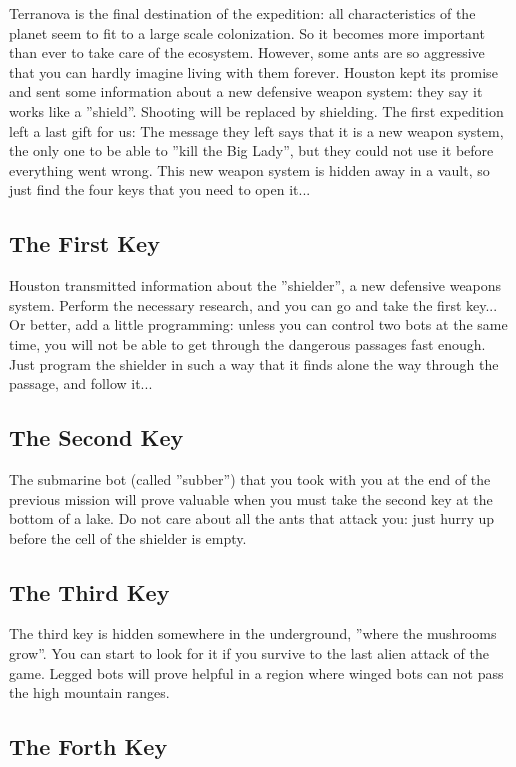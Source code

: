 Terranova is the final destination of the expedition: all characteristics of the planet seem to fit to a large scale colonization. So it becomes more important than ever to take care of the ecosystem. However, some ants are so aggressive that you can hardly imagine living with them forever. Houston kept its promise and sent some information about a new defensive weapon system: they say it works like a ''shield''. Shooting will be replaced by shielding. The first expedition left a last gift for us: The message they left says that it is a new weapon system, the only one to be able to ''kill the Big Lady'', but they could not use it before everything went wrong. This new weapon system is hidden away in a vault, so just find the four keys that you need to open it...


\subsection{The First Key}

Houston transmitted information about the ''shielder'', a new defensive weapons system. Perform the necessary research, and you can go and take the first key... Or better, add a little programming: unless you can control two bots at the same time, you will not be able to get through the dangerous passages fast enough. Just program the shielder in such a way that it finds alone the way through the passage, and follow it...


\subsection{The Second Key}

The submarine bot (called ''subber'') that you took with you at the end of the previous mission will prove valuable when you must take the second key at the bottom of a lake. Do not care about all the ants that attack you: just hurry up before the cell of the shielder is empty.


\subsection{The Third Key}

The third key is hidden somewhere in the underground, ''where the mushrooms grow''. You can start to look for it if you survive to the last alien attack of the game. Legged bots will prove helpful in a region where winged bots can not pass the high mountain ranges.


\subsection{The Forth Key}

